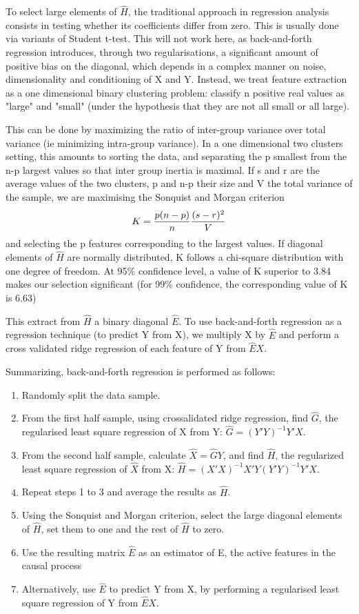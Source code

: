 \documentclass{article}
\begin{document}
To select large elements of $\hat H$, the traditional approach in regression analysis consists in testing whether its coefficients differ from zero. This is usually done via variants of Student t-test.
%
This will not work here, as back-and-forth regression introduces, through two regularisations, a significant amount of positive bias on the diagonal, which depends in a complex manner on noise, dimensionality and conditioning of X and Y.
%
Instead, we treat feature extraction as a one dimensional binary clustering problem: classify n positive real values as "large" and "small" (under the hypothesis that they are not all small or all large).

This can be done by maximizing the ratio of inter-group variance over total variance (ie minimizing intra-group variance).
%
In a one dimensional two clusters setting, this amounts to sorting the data, and separating the p smallest from the n-p largest values so that inter group inertia is maximal.
%
If s and r are the average values of the two clusters, p and n-p their size and V the total variance of the sample, we are maximising the Sonquist and Morgan criterion $$K = {p (n-p) \over n} {(s-r)^2 \over V}$$ and selecting the p features corresponding to the largest values.
%
If diagonal elements of $\hat H$ are normally distributed, K follows a chi-square distribution with one degree of freedom.
%
At 95\% confidence level, a value of K superior to 3.84 makes our selection significant (for 99\% confidence, the corresponding value of K is 6.63) \citep{Kass_75}

This extract from $\hat H$ a binary diagonal $\hat E$.
%
To use back-and-forth regression as a regression technique (to predict Y from X), we multiply X by $\hat E$ and perform a cross validated ridge regression of each feature of Y from $\hat E X$.

Summarizing, back-and-forth regression is performed as follows:
\begin{enumerate}
\item Randomly split the data sample.
\item From the first half sample, using crossalidated ridge regression, find $\hat G$, the regularised least square regression of X from Y: $\hat G=(Y'Y)^{-1} Y'X$.
\item From the second half sample, calculate $\hat X = \hat G Y$, and find $\hat H$, the regularized least square regression of $\hat X$ from X: $\hat H=(X'X)^{-1} X'Y(Y'Y)^{-1} Y'X$.
\item Repeat steps 1 to 3 and average the results as $\hat H$.
\item Using the Sonquist and Morgan criterion, select the large diagonal elements of $\hat H$, set them to one and the rest of $\hat  H$ to zero.
\item Use the resulting matrix $\hat E$ as an estimator of E, the active features in the causal process
\item Alternatively, use $\hat E$ to predict Y from X, by performing a regularised least square regression of Y from $\hat E X$.
%

\end{enumerate}
\end{document}
